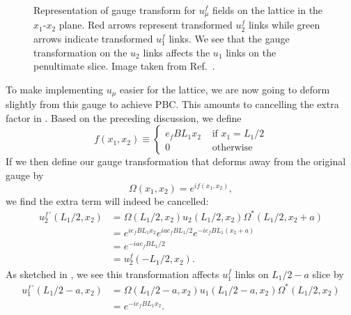 \begin{figure}
\centering
\caption{
Representation of gauge transform for $u^f_\mu$ fields on the lattice in the
$x_1$-$x_2$ plane. Red arrows represent transformed $u_2^f$ links while green
arrows indicate transformed $u_1^f$ links. We see that the gauge transformation
on the $u_2$ links affects the $u_1$ links on the penultimate slice.
Image taken from Ref.~\cite{brandt_thermal_2023}.
}
\label{fig:Bxform}
\end{figure}

To make implementing $u_\mu$ easier for the lattice, we are now going to deform
slightly from this gauge to achieve PBC. This amounts to cancelling the extra
factor in . Based on the preceding discussion, we define
\begin{equation}
f(x_1, x_2)\equiv\left\{\begin{array}{cc}
e_f B L_1 x_2 & \text { if } x_1=L_1 / 2 \\
0 & \text { otherwise }
\end{array}\right.
\end{equation}
If we then define our gauge transformation that deforms away from the original
gauge by
\begin{equation}
\Omega(x_1,x_2)=e^{if(x_1,x_2)},
\end{equation}
we find the extra term will indeed be cancelled:
\begin{equation}
\begin{aligned}
u_2^{f\,\prime}\left(L_1 / 2, x_2\right) & =\Omega\left(L_1 / 2, x_2\right) u_2\left(L_1 / 2, x_2\right) \Omega^*\left(L_1 / 2, x_2+a\right) \\
& =e^{i e_f B L_1 x_2} e^{i a e_f B L_1 / 2} e^{-i e_f B L_1\left(x_2+a\right)} \\
& =e^{-i a e_f B L_1 / 2} \\
& =u^f_2\left(-L_1 / 2, x_2\right).
\end{aligned}
\end{equation}
As sketched in , we see this transformation affects $u_1^f$
links on $L_1/2-a$ slice by
\begin{equation}
\begin{aligned}
u_1^{f\,\prime}\left(L_1 / 2-a, x_2\right) & =\Omega\left(L_1 / 2-a, x_2\right) u_1\left(L_1 / 2-a, x_2\right) \Omega^*\left(L_1 / 2, x_2\right) \\
& =e^{-i e_f B L_1 x_2}.
\end{aligned}
\end{equation} 
